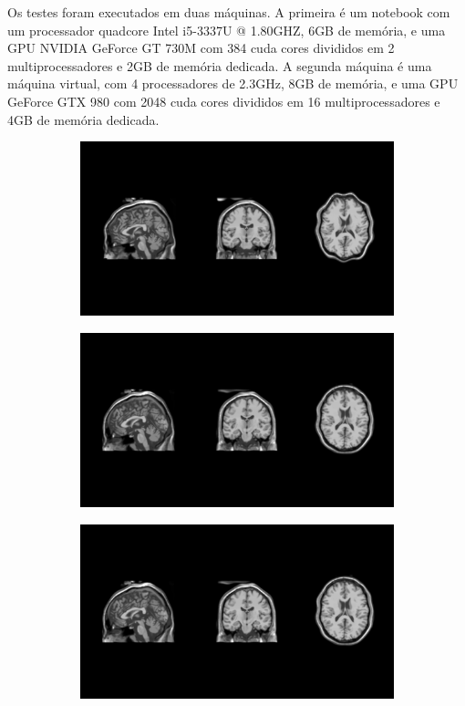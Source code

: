   Os testes foram executados em duas máquinas. A primeira é um notebook com
um processador quadcore Intel i5-3337U @ 1.80GHZ, 6GB de memória, e uma GPU
NVIDIA GeForce GT 730M com 384 cuda cores divididos em 2 multiprocessadores e
2GB de memória dedicada. A segunda máquina é uma máquina virtual, com 4
processadores de 2.3GHz, 8GB de memória, e uma GPU GeForce GTX 980 com 2048
cuda cores divididos em 16 multiprocessadores e 4GB de memória dedicada.

\begin{figure}[H]
    \centering
    \begin{subfigure}[t]{0.5\textwidth}
      \includegraphics[width=\textwidth]{figuras/result001.png}
      \label{fig:unequalizedImage}
    \end{subfigure}
    \begin{subfigure}[t]{0.5\textwidth}
      \includegraphics[width=\textwidth]{figuras/result002.png}
      \label{fig:equalizedImage}
    \end{subfigure}
    \begin{subfigure}[t]{0.5\textwidth}
      \includegraphics[width=\textwidth]{figuras/result003.png}

\end{subfigure}
\end{figure}
